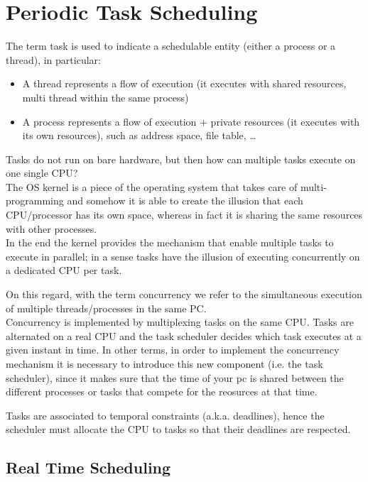 \chapter{Periodic Task Scheduling}
The term task is used to indicate a schedulable entity (either a process or a thread), in particular:
\begin{itemize}
    \item A thread represents a flow of execution (it executes with shared resources, multi thread within the same process)
    \item A process represents a flow of execution + private resources (it executes with its own resources), such as address space, file table, \dots
\end{itemize}

Tasks do not run on bare hardware, but then how can multiple tasks execute on one single CPU?\\
The OS kernel is a piece of the operating system that takes care of multi-programming and somehow it is able to create the illusion that each CPU/processor has its own space, whereas in fact it is sharing the same resources with other processes.\\
In the end the kernel provides the mechanism that enable multiple tasks to execute in parallel; in a sense tasks have the illusion of executing concurrently on a dedicated CPU per task.

On this regard, with the term concurrency we refer to the simultaneous execution of multiple threads/processes in the same PC.\\
Concurrency is implemented by multiplexing tasks on the same CPU. Tasks are alternated on a real CPU and the task scheduler decides which task executes at a given instant in time. In other terms, in order to implement the concurrency mechanism it is necessary to introduce this new component (i.e. the task scheduler), since it makes sure that the time of your pc is shared between the different processes or tasks that compete for the reosurces at that time.

Tasks are associated to temporal constraints (a.k.a. deadlines), hence the scheduler must allocate the CPU to tasks so that their deadlines are respected.

\section{Real Time Scheduling}


